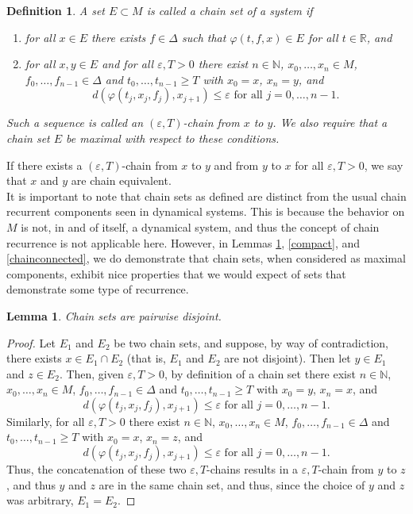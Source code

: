 \documentclass[11pt]{article}
\newtheorem{defn}[thm]{Definition}
\newtheorem{lem}[thm]{Lemma}
\begin{document}
\begin{defn} \label{chain set} A set $E\subset M$ is called a chain set of a system if 
\begin{enumerate}
\item for all $x\in E$ there exists $f\in\Delta$ such that $\varphi(t,f,x)\in E$ for all $t\in\mathbb{R}$, and\\
\item for all $x,y\in E$ and for all $\varepsilon,T>0$ there exist $n\in\mathbb{N}$, $x_0,\ldots,x_n\in M$, $f_0,\ldots,f_{n-1}\in\Delta$ and $t_0,\ldots,t_{n-1}\geq T$ with $x_0=x$, $x_n=y$, and 
$$d(\varphi(t_j,x_j,f_j),x_{j+1})\leq\varepsilon\mbox{ for all }j=0,\ldots,n-1.$$
\end{enumerate}
Such a sequence is called an $(\varepsilon,T)$-chain from $x$ to $y$. We also require that a chain set $E$ be maximal with respect to these conditions.
\end{defn}
If there exists a $(\varepsilon,T)$-chain from $x$ to $y$ and from $y$ to $x$ for all $\varepsilon, T>0$, we say that $x$ and $y$ are chain equivalent.\\
\indent It is important to note that chain sets as defined are distinct from the usual chain recurrent components seen in dynamical systems.  This is because the behavior on $M$ is not, in and of itself, a dynamical system, and thus the concept of chain recurrence is not applicable here.  However, in Lemmas \ref{chaindisjoint}, \ref{compact},  and \ref{chainconnected}, we do demonstrate that chain sets, when considered as maximal components, exhibit nice properties that we would expect of sets that demonstrate some type of recurrence. 


\begin{lem}\label{chaindisjoint}
Chain sets are pairwise disjoint.
\end{lem}
\begin{proof}
Let $E_1$ and $E_2$ be two chain sets, and suppose, by way of contradiction, there exists $x\in E_1\cap E_2$ (that is, $E_1$ and $E_2$ are not disjoint).  Then let $y\in E_1$ and $z\in E_2$.  Then, given $\varepsilon, T>0$, by definition of a chain set there exist $n\in\mathbb{N}$, $x_0,\ldots,x_n\in M$, $f_0,\ldots,f_{n-1}\in\Delta$ and $t_0,\ldots,t_{n-1}\geq T$ with $x_0=y$, $x_n=x$, and 
$$d(\varphi(t_j,x_j,f_j),x_{j+1})\leq\varepsilon\mbox{ for all }j=0,\ldots,n-1.$$  Similarly, for all $\varepsilon, T>0$ there exist $n\in\mathbb{N}$, $x_0,\ldots,x_n\in M$, $f_0,\ldots,f_{n-1}\in\Delta$ and $t_0,\ldots,t_{n-1}\geq T$ with $x_0=x$, $x_n=z$, and 
$$d(\varphi(t_j,x_j,f_j),x_{j+1})\leq\varepsilon\mbox{ for all }j=0,\ldots,n-1.$$
Thus, the concatenation of these two $\varepsilon, T$-chains results in a $\varepsilon, T$-chain from $y$ to $z$, and thus $y$ and $z$ are in the same chain set, and thus, since the choice of $y$ and $z$ was arbitrary, $E_1=E_2$.  
\end{proof}
\end{document}
